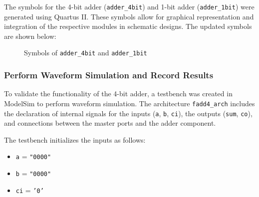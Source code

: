 \documentclass[12pt,a4paper,oneside]{ctexart}
\begin{document}
The symbols for the 4-bit adder (\texttt{adder\_4bit}) and 1-bit adder (\texttt{adder\_1bit}) were generated using Quartus II. These symbols allow for graphical representation and integration of the respective modules in schematic designs. The updated symbols are shown below:

\begin{figure}[h]
    \centering
    \caption{Symbols of \texttt{adder\_4bit} and \texttt{adder\_1bit}}
    \label{fig:symbols}
\end{figure}

\subsubsection{Perform Waveform Simulation and Record Results}

To validate the functionality of the 4-bit adder, a testbench was created in ModelSim to perform waveform simulation. The architecture \texttt{fadd4\_arch} includes the declaration of internal signals for the inputs (\texttt{a}, \texttt{b}, \texttt{ci}), the outputs (\texttt{sum}, \texttt{co}), and connections between the master ports and the adder component.

The testbench initializes the inputs as follows:
\begin{itemize}
    \item \texttt{a} = \texttt{"0000"}
    \item \texttt{b} = \texttt{"0000"}
    \item \texttt{ci} = \texttt{'0'}
\end{itemize}
\end{document}
